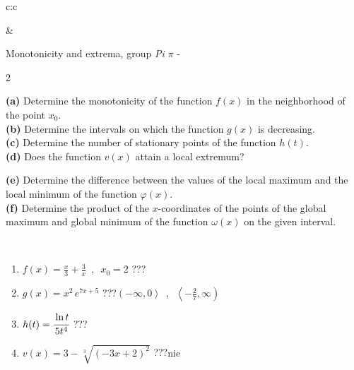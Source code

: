 \documentclass[10pt]{report}
\begin{document}
\begin{tabular}{c:c}
\begin{minipage}[c][104.5mm][t]{0.5\linewidth}
\end{minipage}
&
\begin{minipage}[c][104.5mm][t]{0.5\linewidth}
\begin{center}
\vspace{5mm}
{\huge Monotonicity and extrema, group \textit{Pi $\pi$} -}\\[5mm]
\begin{minipage}{0.95\linewidth}
\begin{center}
{\small \begin{multicols}{2} \raggedright
\textbf{(a)} Determine the monotonicity of the function \(f(x)\) in the neighborhood of the point \(x_0\). \\[1mm]
\textbf{(b)} Determine the intervals on which the function \(g(x)\) is decreasing. \\[1mm]
\textbf{(c)} Determine the number of stationary points of the function \(h(t)\). \\[1mm]
\textbf{(d)} Does the function \(v(x)\) attain a local extremum? \par \columnbreak
\textbf{(e)} Determine the difference between the values of the local maximum and the local minimum of the function \(\varphi(x)\). \\[1mm]
\textbf{(f)} Determine the product of the \(x\)-coordinates of the points of the global maximum and global minimum of the function \(\omega(x)\) on the given interval. \\[1mm]
\end{multicols}
}
\end{center}
\end{minipage}
\\[1mm]
\begin{minipage}{0.79\linewidth}
\begin{center}
\begin{varwidth}{\linewidth}
\setlength{\itemsep}{0pt}
\begin{enumerate}
\normalsize
\item $f(x)=\frac{x}{3}+\frac{3}{x} \enspace , \enspace x_0=2$\quad \dotfill\; ???\;\dotfill \quad {}
\item $g(x)=x^2\, e^{7x+5}$\quad \dotfill\; ???\;\dotfill \quad $\left(-\infty , 0\right\rangle\enspace , \enspace \left\langle-\frac{2}{7} , \infty\right)$
\item $h(t)=\cfrac{\ln t}{5t^4}$\quad \dotfill\; ???\;\dotfill {}
\item $v(x)=3-\sqrt[3]{(-3x+2)^2}$\quad \dotfill\; ???\;\dotfill \quad $\text{nie}$

\end{enumerate}
\end{varwidth}
\end{center}
\end{minipage}
\end{center}
\end{minipage}
\end{tabular}
\end{document}

